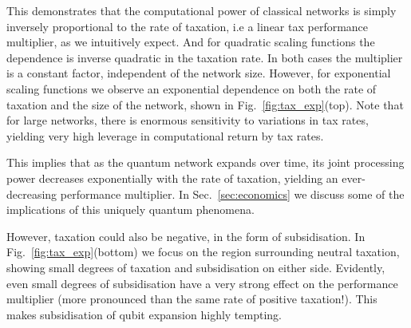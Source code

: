 \documentclass[aps, rmp, twocolumn, amsmath, amssymb, nofootinbib, superscriptaddress, longbibliography, floatfix, table-of-contents, eqsecnum]{revtex4-1}
\begin{document}
This demonstrates that the computational power of classical networks is simply inversely proportional to the rate of taxation, i.e a linear tax performance multiplier, as we intuitively expect. And for quadratic scaling functions the dependence is inverse quadratic in the taxation rate. In both cases the multiplier is a constant factor, independent of the network size. However, for exponential scaling functions we observe an exponential dependence on both the rate of taxation and the size of the network, shown in Fig.~\ref{fig:tax_exp}(top). Note that for large networks, there is enormous sensitivity to variations in tax rates, yielding very high leverage in computational return by tax rates.

This implies that as the quantum network expands over time, its joint processing power decreases exponentially with the rate of taxation, yielding an ever-decreasing performance multiplier. In Sec.~\ref{sec:economics} we discuss some of the implications of this uniquely quantum phenomena.

However, taxation could also be negative, in the form of subsidisation. In Fig.~\ref{fig:tax_exp}(bottom) we focus on the region surrounding neutral taxation, showing small degrees of taxation and subsidisation on either side. Evidently, even small degrees of subsidisation have a very strong effect on the performance multiplier (more pronounced than the same rate of positive taxation!). This makes subsidisation of qubit expansion highly tempting.
\end{document}
